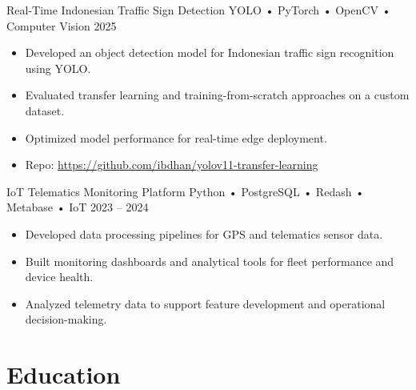 \begin{sectionbody}
\cvproject
    {Real-Time Indonesian Traffic Sign Detection}
    {YOLO • PyTorch • OpenCV • Computer Vision}
    {2025}
    {
        \begin{itemize}[itemsep=1pt, topsep=2pt]
            \item Developed an object detection model for Indonesian traffic sign recognition using YOLO.
            \item Evaluated transfer learning and training-from-scratch approaches on a custom dataset.
            \item Optimized model performance for real-time edge deployment.
            \item Repo: \href{https://github.com/ibdhan/yolov11-transfer-learning}{https://github.com/ibdhan/yolov11-transfer-learning}
        \end{itemize}
    }

\cvproject
    {IoT Telematics Monitoring Platform}
    {Python • PostgreSQL • Redash • Metabase • IoT}
    {2023 -- 2024}
    {
        \begin{itemize}[itemsep=1pt, topsep=2pt]
            \item Developed data processing pipelines for GPS and telematics sensor data.
            \item Built monitoring dashboards and analytical tools for fleet performance and device health.
            \item Analyzed telemetry data to support feature development and operational decision-making.
        \end{itemize}
    }

\end{sectionbody}

\section{Education}

